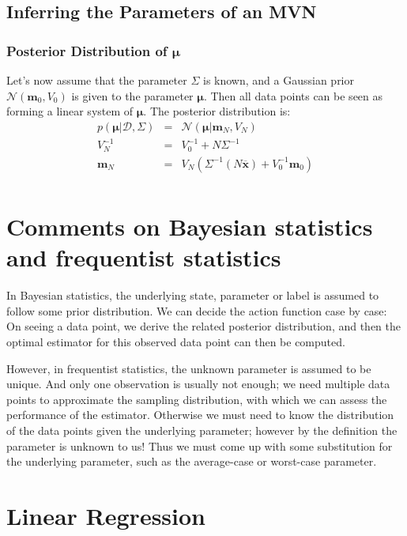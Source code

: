 \documentclass[openany]{book}
\begin{document}
\section{Inferring the Parameters of an MVN}
\subsection{Posterior Distribution of $\boldsymbol{\mu}$}
Let's now assume that the parameter $\Sigma$ is known, and a Gaussian prior $\mathcal{N}(\mathbf{m}_0,V_0)$ is given to the parameter $\boldsymbol{\mu}$. Then all data points can be seen as forming a linear system of $\boldsymbol{\mu}$. The posterior distribution is:
\begin{equation}\label{postmu}
\begin{array}{rcl}
p(\boldsymbol{\mu}|\mathcal{D},\Sigma) & = & \mathcal{N}(\boldsymbol{\mu}|\mathbf{m}_N,V_N) \\
V_N^{-1} & = & V_0^{-1}+N\Sigma^{-1} \\
\mathbf{m}_N & = & V_N(\Sigma^{-1}(N\overline{\mathbf{x}})+V_0^{-1}\mathbf{m}_0) \\
\end{array}
\end{equation}

\chapter*{Comments on Bayesian statistics and frequentist statistics}
In Bayesian statistics, the underlying state, parameter or label is assumed to follow some prior distribution. We can decide the action function case by case: On seeing a data point, we derive the related posterior distribution, and then the optimal estimator for this observed data point can then be computed.

However, in frequentist statistics, the unknown parameter is assumed to be unique. And only one observation is usually not enough; we need multiple data points to approximate the sampling distribution, with which we can assess the performance of the estimator. Otherwise we must need to know the distribution of the data points given the underlying parameter; however by the definition the parameter is unknown to us! Thus we must come up with some substitution for the underlying parameter, such as the average-case or worst-case parameter.

\setcounter{chapter}{6}

\chapter{Linear Regression}
\end{document}
